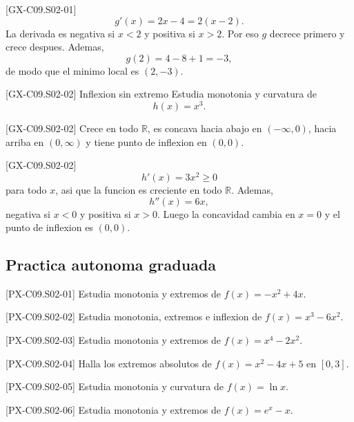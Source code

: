 \begin{fullsolution}{[GX-C09.S02-01]}
\[
g'(x)=2x-4=2(x-2).
\]
La derivada es negativa si \(x<2\) y positiva si \(x>2\). Por eso \(g\) decrece primero y
crece despues. Ademas,
\[
g(2)=4-8+1=-3,
\]
de modo que el minimo local es \((2,-3)\).
\end{fullsolution}

\begin{guidedexercise}{[GX-C09.S02-02] Inflexion sin extremo}
Estudia monotonia y curvatura de
\[
h(x)=x^3.
\]
\end{guidedexercise}

\begin{shortanswer}{[GX-C09.S02-02]}
Crece en todo \(\mathbb{R}\), es concava hacia abajo en \((-\infty,0)\), hacia arriba en
\((0,\infty)\) y tiene punto de inflexion en \((0,0)\).
\end{shortanswer}

\begin{fullsolution}{[GX-C09.S02-02]}
\[
h'(x)=3x^2\geq 0
\]
para todo \(x\), asi que la funcion es creciente en todo \(\mathbb{R}\). Ademas,
\[
h''(x)=6x,
\]
negativa si \(x<0\) y positiva si \(x>0\). Luego la concavidad cambia en \(x=0\) y el punto
de inflexion es \((0,0)\).
\end{fullsolution}

\subsection*{Practica autonoma graduada}
\begin{exercise}{[PX-C09.S02-01] Estudia monotonia y extremos de \(f(x)=-x^2+4x\).}
\end{exercise}
\begin{exercise}{[PX-C09.S02-02] Estudia monotonia, extremos e inflexion de \(f(x)=x^3-6x^2\).}
\end{exercise}
\begin{exercise}{[PX-C09.S02-03] Estudia monotonia y extremos de \(f(x)=x^4-2x^2\).}
\end{exercise}
\begin{exercise}{[PX-C09.S02-04] Halla los extremos absolutos de \(f(x)=x^2-4x+5\) en \([0,3]\).}
\end{exercise}
\begin{exercise}{[PX-C09.S02-05] Estudia monotonia y curvatura de \(f(x)=\ln x\).}
\end{exercise}
\begin{exercise}{[PX-C09.S02-06] Estudia monotonia y extremos de \(f(x)=e^x-x\).}
\end{exercise}

